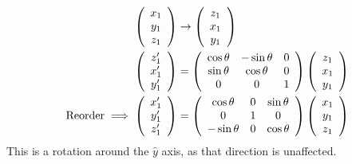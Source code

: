 \begin{align}\left(
{\begin{array}{c}
x_1\\
y_1\\
z_1\\
\end{array}}\right) &\rightarrow
\left(
{\begin{array}{c}
z_1\\
x_1\\
y_1\\
\end{array}}\right) \\
\left(
{\begin{array}{c}
z_1'\\
x_1'\\
y_1'\\
\end{array}}\right) &= 
\left(
{\begin{array}{ccc}
\cos\theta&-\sin\theta&0\\
\sin\theta&\cos\theta&0\\
0&0&1\\
\end{array}}
\right)\left(
{\begin{array}{c}
z_1\\
x_1\\
y_1\\
\end{array}}\right)\\
\rm{Reorder}\implies  
\left(
{\begin{array}{c}
x_1'\\
y_1'\\
z_1'\\
\end{array}}\right)
&= \left(
{\begin{array}{ccc}
\cos\theta&0 &\sin\theta\\
0&1&0\\
-\sin\theta&0&\cos\theta\\
\end{array}}
\right)\left(
{\begin{array}{c}
x_1\\
y_1\\
z_1\\
\end{array}}\right)
\end{align}
This is a rotation around the $\hat{y}$ axis, as that direction is unaffected. 




